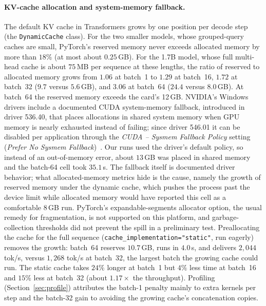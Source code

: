 \documentclass[11pt]{article}
\begin{document}
\paragraph{KV-cache allocation and system-memory fallback.}
The default KV cache in Transformers grows by one position per decode step (the \texttt{DynamicCache} class).
For the two smaller models, whose grouped-query caches are small, PyTorch's reserved memory never exceeds allocated memory by more than $18\%$ (at most about $0.25$\,GB).
For the 1.7B model, whose full multi-head cache is about $75$\,MB per sequence at these lengths, the ratio of reserved to allocated memory grows from $1.06$ at batch~1 to $1.29$ at batch~16, $1.72$ at batch~32 ($9.7$ versus $5.6$\,GB), and $3.06$ at batch~64 ($24.4$ versus $8.0$\,GB).
At batch~64 the reserved memory exceeds the card's 12\,GB.
NVIDIA's Windows drivers include a documented CUDA system-memory fallback, introduced in driver 536.40, that places allocations in shared system memory when GPU memory is nearly exhausted instead of failing; since driver 546.01 it can be disabled per application through the \emph{CUDA -- Sysmem Fallback Policy} setting (\emph{Prefer No Sysmem Fallback})~\cite{nvidia5490}.
Our runs used the driver's default policy, so instead of an out-of-memory error, about $13$\,GB was placed in shared memory and the batch-64 cell took $35.1$\,s.
The fallback itself is documented driver behavior; what allocated-memory metrics hide is the cause, namely the growth of reserved memory under the dynamic cache, which pushes the process past the device limit while allocated memory would have reported this cell as a comfortable $8$\,GB run.
PyTorch's expandable-segments allocator option, the usual remedy for fragmentation, is not supported on this platform, and garbage-collection thresholds did not prevent the spill in a preliminary test.
Preallocating the cache for the full sequence (\texttt{cache\_implementation="static"}, run eagerly) removes the growth: batch~64 reserves $10.7$\,GB, runs in $4.0$\,s, and delivers $2{,}044$ tok/s, versus $1{,}268$ tok/s at batch~32, the largest batch the growing cache could run.
The static cache takes $24\%$ longer at batch~1 but $4\%$ less time at batch~16 and $15\%$ less at batch~32 (about $1.17\times$ the throughput).
Profiling (Section~\ref{sec:profile}) attributes the batch-1 penalty mainly to extra kernels per step and the batch-32 gain to avoiding the growing cache's concatenation copies.
\end{document}
